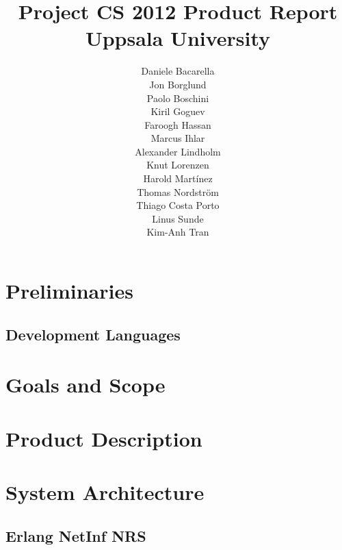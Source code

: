 \documentclass[11pt]{report}
\title{Project CS 2012 Product Report\\Uppsala University\\}
\author{Daniele Bacarella\\
		Jon Borglund\\
		Paolo Boschini\\
		Kiril Goguev\\
		Faroogh Hassan\\
		Marcus Ihlar\\
		Alexander Lindholm\\
		Knut Lorenzen\\
		Harold Mart\'{i}nez\\
		Thomas Nordstr\"om\\
		Thiago Costa Porto\\
		Linus Sunde\\
		Kim-Anh Tran
}
\date{}
\begin{document}
\maketitle




\tableofcontents



\chapter{Preliminaries}
\label{sec:preliminaries}

\section{Development Languages}


\chapter{Goals and Scope}
\label{sec:goals}



\chapter{Product Description}
\label{sec:product}





\chapter{System Architecture}
\label{sec:architecture}



\section {Erlang NetInf NRS}






\end{document}
